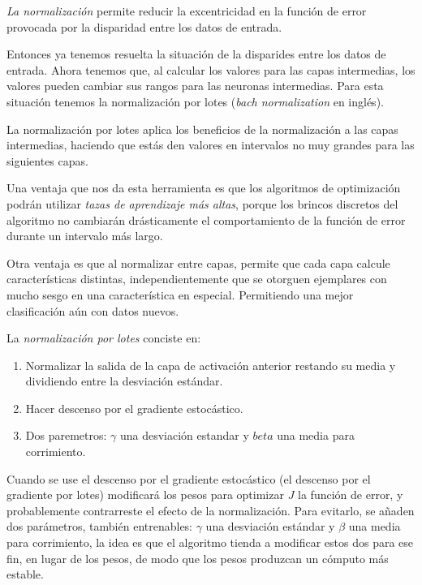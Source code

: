 \begin{definition}
 \emph{La normalización} permite reducir la excentricidad en la función de error provocada por la disparidad entre los datos de entrada.
\end{definition}
  
 Entonces ya tenemos resuelta la situación de la disparides entre los datos de entrada. Ahora tenemos que, al calcular los valores para las capas intermedias, los valores pueden cambiar sus rangos para las neuronas intermedias. Para esta situación tenemos la normalización por lotes (\emph{bach normalization} en inglés).
 
La normalización por lotes aplica los beneficios de la normalización a las capas intermedias, haciendo que estás den valores en intervalos no muy grandes para las siguientes capas.

Una ventaja que nos da esta herramienta es que los algoritmos de optimización podrán utilizar \textit{tazas de aprendizaje más altas}, porque los brincos discretos del algoritmo no cambiarán drásticamente el comportamiento de la función de error durante un intervalo más largo.

Otra ventaja es que al normalizar entre capas, permite que cada capa calcule características distintas, independientemente que se otorguen ejemplares con mucho sesgo en una característica en especial. Permitiendo una mejor clasificación aún con datos nuevos. 

\begin{definition}
 La \emph{normalización por lotes} conciste en: 
 \begin{enumerate}
  \item  Normalizar la salida de la capa de activación anterior restando su media y dividiendo entre la desviación estándar.
  \item Hacer descenso por el gradiente estocástico.
  \item Dos paremetros: $\gamma$ una desviación estandar y $beta$ una media para corrimiento.
 \end{enumerate}
\end{definition}

Cuando se use el descenso por el gradiente estocástico (el descenso por el gradiente por lotes) modificará los pesos para optimizar $J$ la función de error, y probablemente contrarreste el efecto de la normalización.
Para evitarlo, se añaden dos parámetros, también entrenables: $\gamma$ una desviación estándar y $\beta$ una media para corrimiento, la idea es que el algoritmo tienda a
modificar estos dos para ese fin, en lugar de los pesos, de modo que los pesos produzcan un cómputo más estable.

